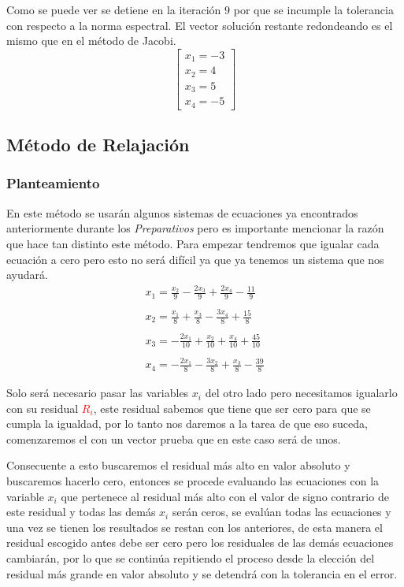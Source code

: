 \documentclass{article}
\begin{document}
Como se puede ver se detiene en la iteración $9$ por que se incumple la tolerancia con respecto a la norma espectral. El vector solución restante redondeando es el mismo que en el método de Jacobi.
\begin{equation*}
   \begin{bmatrix}
       x_1 = -3 \\
       x_2 = 4 \\
       x_3 = 5 \\
       x_4 = -5
   \end{bmatrix}
\end{equation*}


\subsection{Método de Relajación}
\subsubsection{Planteamiento}
En este método se usarán algunos sistemas de ecuaciones ya encontrados anteriormente durante los \emph{Preparativos}
pero es importante mencionar la razón que hace tan distinto este método.
Para empezar tendremos que igualar cada ecuación a cero pero esto no será difícil ya que ya tenemos un sistema que nos ayudará.
\begin{equation*}
   \begin{matrix}
       x_1 = \frac{x_2}{9} - \frac{2x_3}{9} +\frac{2x_4}{9} - \frac{11}{9}\\
       \\
       x_2 = \frac{x_1}{8} + \frac{x_3}{8} - \frac{3x_4}{8} + \frac{15}{8}\\
       \\
       x_3 = -\frac{2x_1}{10} + \frac{x_2}{10} + \frac{x_4}{10} + \frac{45}{10}\\
       \\
       x_4 = - \frac{2x_1}{8} - \frac{3x_2}{8} + \frac{x_3}{8} - \frac{39}{8}
   \end{matrix}
\end{equation*}


Solo será necesario pasar las variables $x_i$ del otro lado pero necesitamos igualarlo con su residual \textcolor{red}{$R_i$},
este residual sabemos que tiene que ser cero para que se cumpla la igualdad, por lo tanto nos daremos a la tarea de que eso suceda,
comenzaremos el con un vector prueba que en este caso será de unos.


Consecuente a esto buscaremos el residual más alto en valor absoluto y buscaremos hacerlo cero, entonces se procede evaluando
las ecuaciones con la variable $x_i$ que pertenece al residual más alto con el valor de signo contrario de este residual y todas
las demás $x_i$ serán ceros, se evalúan todas las ecuaciones y una vez se tienen los resultados se restan con los anteriores,
de esta manera el residual escogido antes debe ser cero pero los residuales de las demás ecuaciones cambiarán, por lo que se continúa
repitiendo el proceso desde la elección del residual más grande en valor absoluto y se detendrá con la tolerancia en el error.
\end{document}
